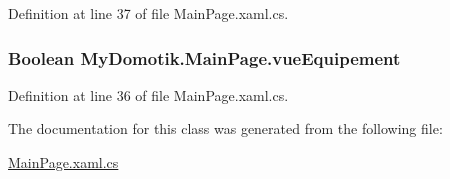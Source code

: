 Definition at line 37 of file Main\+Page.\+xaml.\+cs.

\subsubsection[{\texorpdfstring{vue\+Equipement}{vueEquipement}}]{\setlength{\rightskip}{0pt plus 5cm}Boolean My\+Domotik.\+Main\+Page.\+vue\+Equipement\hspace{0.3cm}{\ttfamily [private]}}\hypertarget{class_my_domotik_1_1_main_page_aab5a1b90bbbf54d6daf2833f0aeb469e}{}\label{class_my_domotik_1_1_main_page_aab5a1b90bbbf54d6daf2833f0aeb469e}


Definition at line 36 of file Main\+Page.\+xaml.\+cs.



The documentation for this class was generated from the following file\+:\begin{DoxyCompactItemize}
\item 
\hyperlink{_main_page_8xaml_8cs}{Main\+Page.\+xaml.\+cs}\end{DoxyCompactItemize}
